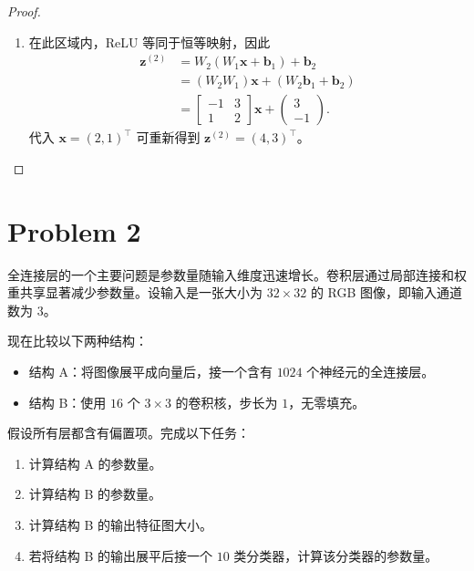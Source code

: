 \begin{proof}
\begin{enumerate}
\[            2x_1+x_2-1>0,\qquad
            -x_1+2x_2+1>0.
        \]
        \item 在此区域内，ReLU 等同于恒等映射，因此
        \[
        \begin{aligned}
            \bm{z}^{(2)}
            &=W_2(W_1\bm{x}+\bm{b}_1)+\bm{b}_2\\
            &=(W_2W_1)\bm{x}+(W_2\bm{b}_1+\bm{b}_2)\\
            &=\boxed{
              \begin{bmatrix}-1&3\\1&2\end{bmatrix}\bm{x}
              +\begin{pmatrix}3\\-1\end{pmatrix}}.
        \end{aligned}
        \]
        代入 $\bm{x}=(2,1)^\top$ 可重新得到 $\bm{z}^{(2)}=(4,3)^\top$。
    \end{enumerate}
\end{proof}

\section*{Problem 2}

全连接层的一个主要问题是参数量随输入维度迅速增长。卷积层通过局部连接和权重共享显著减少参数量。设输入是一张大小为 $32 \times 32$ 的 RGB 图像，即输入通道数为 $3$。

现在比较以下两种结构：
\begin{itemize}
    \item 结构 A：将图像展平成向量后，接一个含有 $1024$ 个神经元的全连接层。
    \item 结构 B：使用 $16$ 个 $3 \times 3$ 的卷积核，步长为 $1$，无零填充。
\end{itemize}
假设所有层都含有偏置项。完成以下任务：
\begin{enumerate}
    \item 计算结构 A 的参数量。
    \item 计算结构 B 的参数量。
    \item 计算结构 B 的输出特征图大小。
    \item 若将结构 B 的输出展平后接一个 $10$ 类分类器，计算该分类器的参数量。
\end{enumerate}

